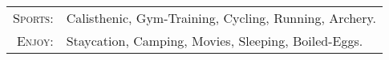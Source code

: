 %
%



\begin{tabular}{rl}
    \textsc{Sports:} & Calisthenic, Gym-Training, Cycling, Running, Archery.\\
    \textsc{Enjoy:} & Staycation, Camping, Movies, Sleeping, Boiled-Eggs.\\
\end{tabular}